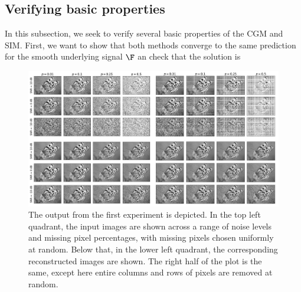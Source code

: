 \begin{algorithm}[t]
\begin{algorithmic}
        \vspace{0.15cm}
        \vspace{0.15cm}
        \vspace{0.15cm}
        \State{$\D \leftarrow  \RR + \delta \D $}
        \vspace{0.15cm}
        \EndWhile
        \vspace{0.25cm}
        \vspace{0.15cm}
    \end{algorithmic}
\end{algorithm}

\subsection{Verifying basic properties}

In this subsection, we seek to verify several basic properties of the CGM and SIM. First, we want to show that both methods converge to the same prediction for the smooth underlying signal $\F$ an check that the solution is 


\begin{figure}[t]
    \hypertarget{butterflies}{}
    \label{fig:butterflies}
    \begin{center}
        \includegraphics[width=0.95\linewidth]{Figures/butterflies.jpg}
    \end{center}
    \caption{\small{The output from the first experiment is depicted. In the top left quadrant, the input images are shown across a range of noise levels and missing pixel percentages, with missing pixels chosen uniformly at random. Below that, in the lower left quadrant, the corresponding reconstructed images are shown. The right half of the plot is the same, except here entire columns and rows of pixels are removed at random.}}
\end{figure}


